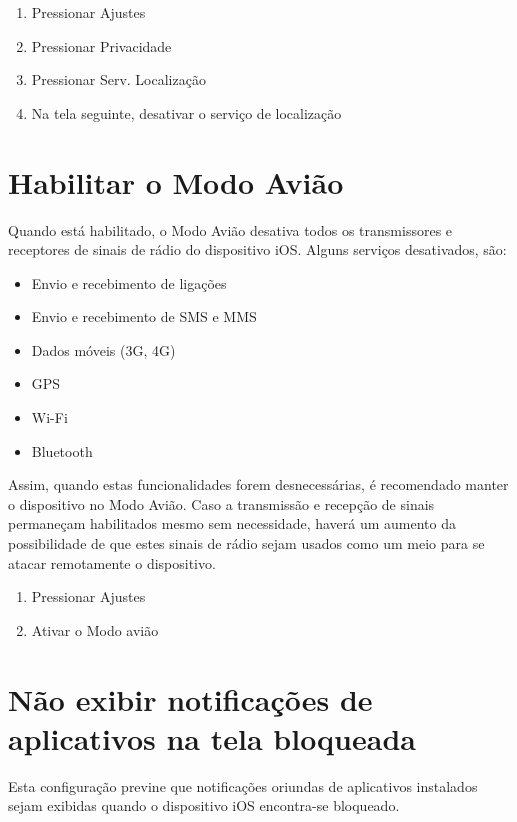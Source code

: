 \begin{enumerate}
\item Pressionar Ajustes
\item Pressionar Privacidade
\item Pressionar Serv. Localiza\c c\~ao
\item Na tela seguinte, desativar o servi\c co de localiza\c c\~ao
\end{enumerate}

\section{Habilitar o Modo Avi\~ao}

Quando est\'a habilitado, o Modo Avi\~ao desativa todos os transmissores e receptores de sinais de r\'adio do dispositivo iOS. Alguns servi\c cos desativados, s\~ao:

\begin{itemize}
\item Envio e recebimento de liga\c c\~oes
\item Envio e recebimento de SMS e MMS
\item Dados m\'oveis (3G, 4G)
\item GPS
\item Wi-Fi
\item Bluetooth
\end{itemize}

Assim, quando estas funcionalidades forem desnecess\'arias, \'e recomendado manter o dispositivo no Modo Avi\~ao. Caso a transmiss\~ao e recep\c c\~ao de sinais permane\c cam habilitados mesmo sem necessidade, haver\'a um aumento da possibilidade de que estes sinais de r\'adio sejam usados como um  meio para se atacar remotamente o dispositivo.

\begin{enumerate}
\item Pressionar Ajustes
\item Ativar o Modo avi\~ao
\end{enumerate}

\section{N\~ao exibir notifica\c c\~oes de aplicativos na tela bloqueada}

Esta configura\c c\~ao previne que notifica\c c\~oes oriundas de aplicativos instalados sejam exibidas quando o dispositivo iOS encontra-se bloqueado. 

